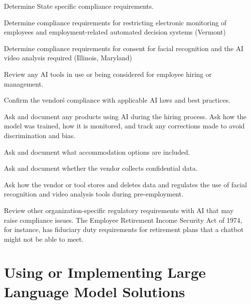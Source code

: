 \begin{minipage}{\linewidth}
\begin{checklist}
  \item Determine State specific compliance requirements.
  \item Determine compliance requirements for restricting electronic monitoring of employees and employment-related automated decision systems (Vermont)
  \item Determine compliance requirements for consent for facial recognition and the AI video analysis required (Illinois, Maryland)
  \item Review any AI tools in use or being considered for employee hiring or management.
  \item Confirm the vendor\'s compliance with applicable AI laws and best practices.
  \item Ask and document any products using AI during the hiring process. Ask how the model was trained, how it is monitored, and track any corrections made to avoid discrimination and bias.
  \item Ask and document what accommodation options are included.
  \item Ask and document whether the vendor collects confidential data.
  \item Ask how the vendor or tool stores and deletes data and regulates the use of facial recognition and video analysis tools during pre-employment.
  \item Review other organization-specific regulatory requirements with AI that may raise compliance issues. The Employee Retirement Income Security Act of 1974, for instance, has fiduciary duty requirements for retirement plans that a chatbot might not be able to meet.
\end{checklist}
\end{minipage}

\section{Using or Implementing Large Language Model Solutions}

